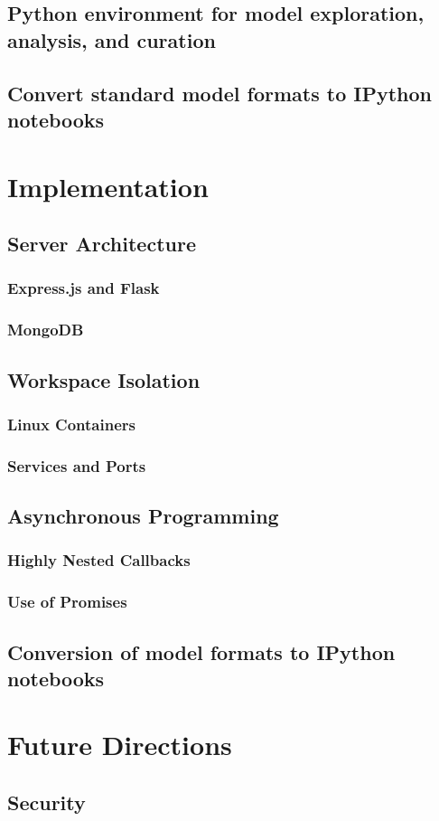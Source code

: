 \subsection{Python environment for model exploration, analysis, and curation}
\subsection{Convert standard model formats to IPython notebooks}


\section{Implementation}
\subsection{Server Architecture}
\subsubsection{Express.js and Flask}
\subsubsection{MongoDB}
\subsection{Workspace Isolation}
\subsubsection{Linux Containers}
\subsubsection{Services and Ports}
\subsection{Asynchronous Programming}
\subsubsection{Highly Nested Callbacks}
\subsubsection{Use of Promises}
\subsection{Conversion of model formats to IPython notebooks}

\section{Future Directions}
\subsection{Security}
